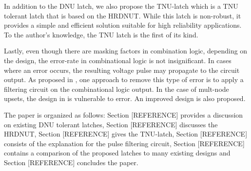 In addition to the DNU latch, we also propose the  TNU-latch which is a TNU tolerant latch that is based on the HRDNUT. While this latch is non-robust, it provides a simple and efficient solution suitable for high reliability applications. To the author's knowledge, the TNU latch is the first of its kind. 

Lastly, even though there are masking factors in combination logic, depending on the design, the error-rate in combinational logic is not insignificant. In cases where an error occurs, the resulting voltage pulse may propagate to the circuit output. As proposed in \cite{FERST}, one approach to remove this type of error is to apply a filtering circuit on the combinational logic output. In the case of mult-node upsets, the design in \cite{FERST} is vulnerable to error. An improved design is also proposed. 

The paper is organized as follows: Section [REFERENCE] provides a discussion on existing DNU tolerant latches, Section [REFERENCE] discusses the HRDNUT, Section [REFERENCE] gives the TNU-latch, Section [REFERENCE] consists of the explanation for the pulse filtering circuit, Section [REFERENCE] contains a comparison of the proposed latches to many existing designs and Section [REFERENCE] concludes the paper.